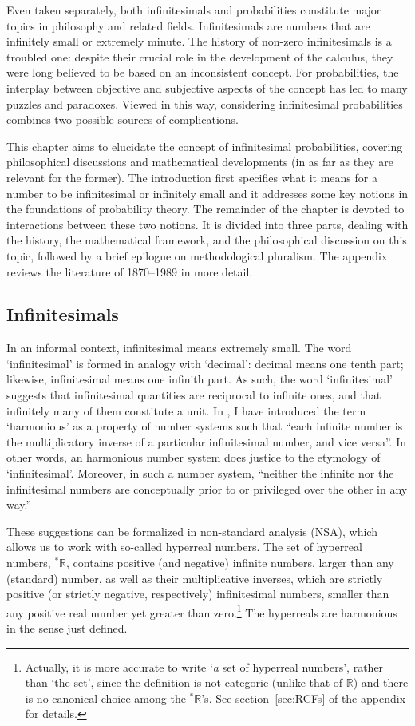 Even taken separately, both infinitesimals and probabilities constitute major topics in philosophy and related fields.
Infinitesimals are numbers that are infinitely small or extremely minute. The history of non-zero infinitesimals is a troubled one: despite their crucial role in the development of the calculus, they were long believed to be based on an inconsistent concept.
For probabilities, the interplay between objective and subjective aspects of the concept has led to many puzzles and paradoxes.
Viewed in this way, considering infinitesimal probabilities combines two possible sources of complications.

This chapter aims to elucidate the concept of infinitesimal probabilities, covering philosophical discussions and mathematical developments (in as far as they are relevant for the former).
The introduction first specifies what it means for a number to be infinitesimal or infinitely small and it addresses some key notions in the foundations of probability theory.
The remainder of the chapter is devoted to interactions between these two notions. It is divided into three parts, dealing with the history, the mathematical framework, and the philosophical discussion on this topic, followed by a brief epilogue on methodological pluralism. The appendix reviews the literature of 1870--1989 in more detail.

\subsection*{Infinitesimals}\label{sec:infinitesimals}
In an informal context, infinitesimal means extremely small.
The word `infinitesimal' is formed in analogy with `decimal': decimal means one tenth part; likewise, infinitesimal means one infinith part. As such, the word `infinitesimal' suggests that infinitesimal quantities are reciprocal to infinite ones, and that infinitely many of them constitute a unit.
In \citet{Wenmackers:forthc}, I have introduced the term `harmonious' as a property of number systems such that ``each infinite number is the multiplicatory inverse of a particular infinitesimal number, and vice versa''. In other words, an harmonious number system does justice to the etymology of `infinitesimal'. Moreover, in such a number system, ``neither the infinite nor the infinitesimal numbers are conceptually prior to or privileged over the other in any way.''

These suggestions can be formalized in non-standard analysis (NSA), which allows us to work with so-called hyperreal numbers. The set of hyperreal numbers, ${^*} \mathbb{R}$, contains positive (and negative) infinite numbers, larger than any (standard) number, as well as their multiplicative inverses, which are strictly positive (or strictly negative, respectively) infinitesimal numbers, smaller than any positive real number yet greater than zero.\footnote{Actually, it is more accurate to write `\emph{a} set of hyperreal numbers', rather than `the set', since the definition is not categoric (unlike that of $\mathbb{R}$) and there is no canonical choice among the ${^*} \mathbb{R}$'s. See section~\ref{sec:RCFs} of the appendix for details.\label{fn:a-not-the}} The hyperreals are harmonious in the sense just defined.

